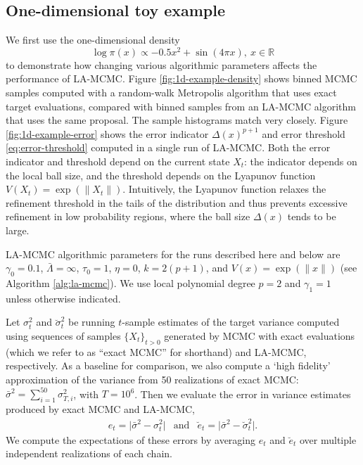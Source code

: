 \subsection{One-dimensional toy example} \label{sec:1d-example}

We first use the one-dimensional density
\begin{equation}
    \log{\pi(x)} \propto -0.5 x^2 + \sin{(4 \pi x)}, \ x \in \mathbb{R}
\end{equation}
to demonstrate how changing various algorithmic parameters affects the performance of LA-MCMC. Figure \ref{fig:1d-example-density} shows binned MCMC samples computed with a random-walk Metropolis algorithm that uses exact target evaluations, compared with binned samples from an LA-MCMC algorithm that uses the same proposal. The sample histograms match very closely. Figure \ref{fig:1d-example-error} shows the error indicator $\Delta(x)^{p+1}$ and error threshold \eqref{eq:error-threshold} computed in a single run of LA-MCMC. Both the error indicator and threshold depend on the current state $X_t$: the indicator depends on the local ball size, and the threshold depends on the Lyapunov function $V(X_t) = \exp{(\|X_t\|)}$. Intuitively, the Lyapunov function relaxes the refinement threshold in the tails of the distribution and thus prevents excessive refinement in low probability regions, where the ball size $\Delta(x)$ tends to be large. 

LA-MCMC algorithmic parameters for the runs described here and below are $\gamma_0=0.1$,  $\bar{\Lambda} = \infty$, $\tau_0=1$, $\eta = 0$, $k=2(p+1)$, and $V(x) = \exp{(\|x\|)}$ (see Algorithm \ref{alg:la-mcmc}). We use local polynomial degree $p=2$ and $\gamma_1 = 1$ unless otherwise indicated.

Let $\sigma^2_t$ and $\breve{\sigma}^2_t$ be running $t$-sample estimates of the target variance computed using sequences of samples $\{X_t\}_{t>0}$ generated by MCMC with exact evaluations (which we refer to as ``exact MCMC'' for shorthand) and LA-MCMC, respectively. As a baseline for comparison, we also compute a `high fidelity' approximation of the variance from 50 realizations of exact MCMC: $\bar{\sigma}^2 = \sum_{i=1}^{50} \sigma_{T,i}^2$, with $T = 10^{6}$. Then we evaluate the error in variance estimates produced by exact MCMC and LA-MCMC,
\begin{equation}
    \begin{array}{ccc}
        e_t = \vert \bar{\sigma}^2 - \sigma_t^2 \vert & \mbox{and} & \breve{e}_t = \vert \bar{\sigma}^2 - \breve{\sigma}_t^2 \vert.
    \end{array}
\end{equation}
We compute the expectations of these errors by averaging $e_t$ and $\breve{e}_t$ over multiple independent realizations of each chain.  


